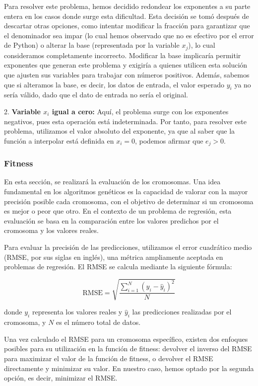 \documentclass[conference,a4paper]{IEEEtran}
\begin{document}
Para resolver este problema, hemos decidido redondear los exponentes a su parte entera en los casos donde surge esta dificultad. Esta decisión se tomó después de descartar otras opciones, como intentar modificar la fracción para garantizar que el denominador sea impar (lo cual hemos observado que no es efectivo por el error de Python) o alterar la base (representada por la variable \(x_j\)), lo cual consideramos completamente incorrecto. Modificar la base implicaría permitir exponentes que generan este problema y exigiría a quienes utilicen esta solución que ajusten sus variables para trabajar con números positivos. Además, sabemos que si alteramos la base, es decir, los datos de entrada, el valor esperado \(y_i\) ya no sería válido, dado que el dato de entrada no sería el original.




2. \textbf{Variable \( x_i \) igual a cero:} Aquí, el problema surge con los exponentes negativos, pues esta operación está indeterminada. Por tanto, para resolver este problema, utilizamos el valor absoluto del exponente, ya que al saber que la función a interpolar está definida en \( x_i = 0 \), podemos afirmar que \( e_j > 0 \).


\subsubsection{Fitness}
En esta sección, se realizará la evaluación de los cromosomas. Una idea fundamental en los algoritmos genéticos es la capacidad de valorar con la mayor precisión posible cada cromosoma, con el objetivo de determinar si un cromosoma es mejor o peor que otro. En el contexto de un problema de regresión, esta evaluación se basa en la comparación entre los valores predichos por el cromosoma y los valores reales.

Para evaluar la precisión de las predicciones, utilizamos el error cuadrático medio (RMSE, por sus siglas en inglés), una métrica ampliamente aceptada en problemas de regresión. El RMSE se calcula mediante la siguiente fórmula:

\[
\text{RMSE} = \sqrt{\frac{\sum_{i=1}^{N} (y_i - \hat{y}_i)^2}{N}}
\]

donde \( y_i \) representa los valores reales y \( \hat{y}_i \) las predicciones realizadas por el cromosoma, y \( N \) es el número total de datos.

Una vez calculado el RMSE para un cromosoma específico, existen dos enfoques posibles para su utilización en la función de fitness: devolver el inverso del RMSE para maximizar el valor de la función de fitness, o devolver el RMSE directamente y minimizar su valor. En nuestro caso, hemos optado por la segunda opción, es decir, minimizar el RMSE.
\end{document}
